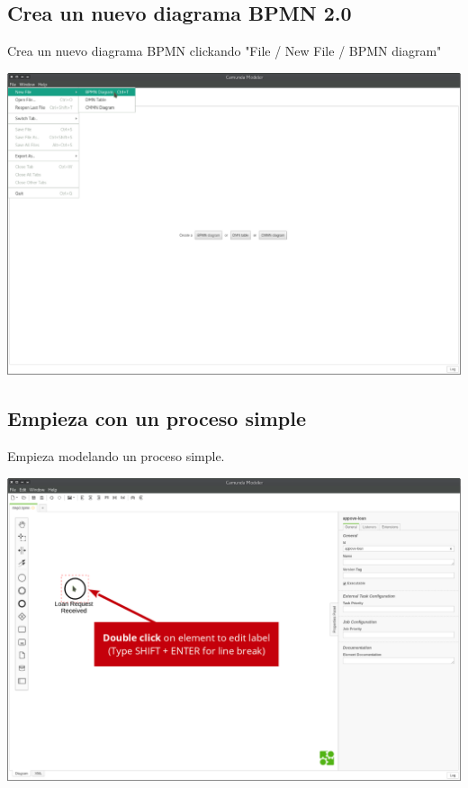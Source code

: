 \documentclass{article}
\begin{document}
\subsection{Crea un nuevo diagrama BPMN 2.0}

Crea un nuevo diagrama BPMN clickando "File / New File / BPMN diagram"

\begin{center}
\includegraphics[width=\textwidth]{modeler-new-bpmn-diagram.png}
\end{center}

\subsection{Empieza con un proceso simple}
Empieza modelando un proceso simple.

\begin{center}
\includegraphics[width=\textwidth]{modeler-step1.png}
\end{center}
\end{document}
